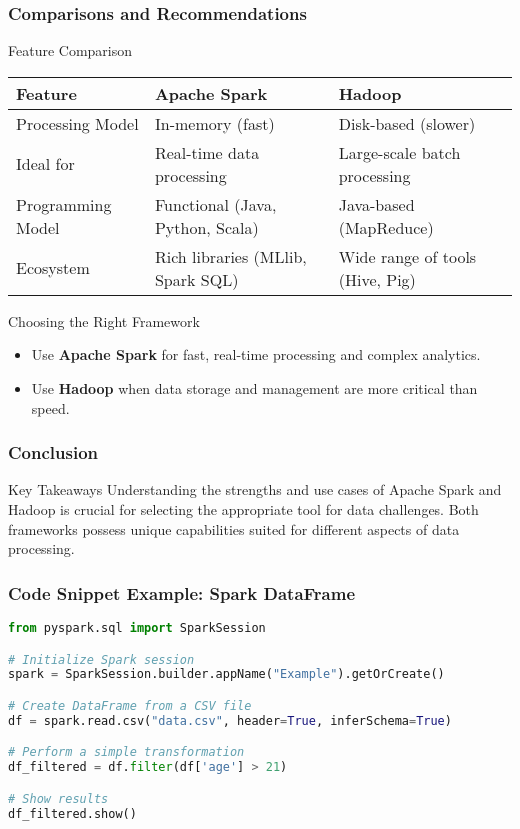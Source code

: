 \documentclass[aspectratio=169]{beamer}
\begin{document}
\begin{frame}[fragile]
    \frametitle{Comparisons and Recommendations}
    \begin{block}{Feature Comparison}
        \begin{tabular}{|l|l|l|}
            \hline
            Feature & Apache Spark & Hadoop \\
            \hline
            Processing Model & In-memory (fast) & Disk-based (slower) \\
            Ideal for & Real-time data processing & Large-scale batch processing \\
            Programming Model & Functional (Java, Python, Scala) & Java-based (MapReduce) \\
            Ecosystem & Rich libraries (MLlib, Spark SQL) & Wide range of tools (Hive, Pig) \\
            \hline
        \end{tabular}
    \end{block}
    
    \begin{block}{Choosing the Right Framework}
        \begin{itemize}
            \item Use \textbf{Apache Spark} for fast, real-time processing and complex analytics.
            \item Use \textbf{Hadoop} when data storage and management are more critical than speed.
        \end{itemize}
    \end{block}
\end{frame}

\begin{frame}[fragile]
    \frametitle{Conclusion}
    \begin{block}{Key Takeaways}
        Understanding the strengths and use cases of Apache Spark and Hadoop is crucial for selecting the appropriate tool for data challenges. 
        Both frameworks possess unique capabilities suited for different aspects of data processing.
    \end{block}
\end{frame}

\begin{frame}[fragile]
    \frametitle{Code Snippet Example: Spark DataFrame}
    \begin{lstlisting}[language=Python]
from pyspark.sql import SparkSession

# Initialize Spark session
spark = SparkSession.builder.appName("Example").getOrCreate()

# Create DataFrame from a CSV file
df = spark.read.csv("data.csv", header=True, inferSchema=True)

# Perform a simple transformation
df_filtered = df.filter(df['age'] > 21)

# Show results
df_filtered.show()
    \end{lstlisting}
\end{frame}
\end{document}
